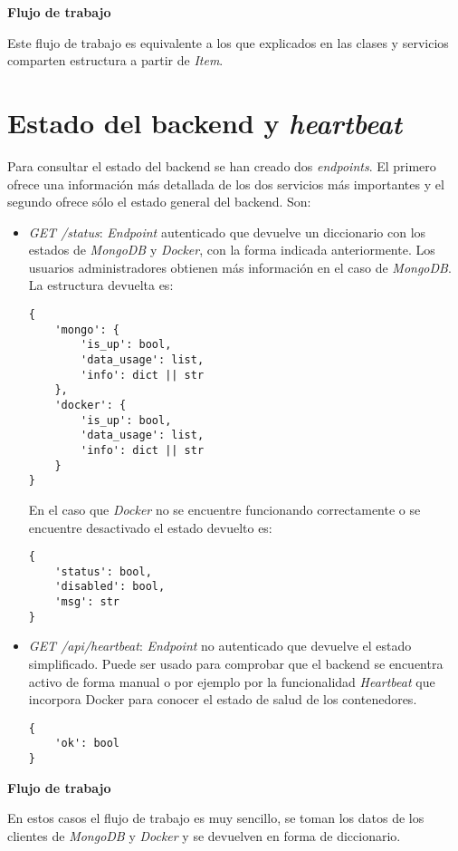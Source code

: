 \bigskip
\textbf{Flujo de trabajo}

Este flujo de trabajo es equivalente a los que explicados en las clases y servicios comparten estructura a partir de \textit{Item}.

\section{Estado del backend y \textit{heartbeat}}


Para consultar el estado del backend se han creado dos \textit{endpoints}. El primero ofrece una información más detallada de los dos servicios más importantes y el segundo ofrece sólo el estado general del backend. Son:
\begin{itemize}
	\item \textit{GET /status}: \textit{Endpoint} autenticado que devuelve un diccionario con los estados de \textit{MongoDB} y \textit{Docker}, con la forma indicada anteriormente. Los usuarios administradores obtienen más información en el caso de \textit{MongoDB}. La estructura devuelta es:

\begin{lstlisting}
{
	'mongo': {
		'is_up': bool,
		'data_usage': list,
		'info': dict || str
	},
	'docker': {
		'is_up': bool,
		'data_usage': list,
		'info': dict || str
	}
}
\end{lstlisting}

\bigskip	
En el caso que \textit{Docker} no se encuentre funcionando correctamente o se encuentre desactivado el estado devuelto es:
	
\begin{lstlisting}
{
	'status': bool,
	'disabled': bool,
	'msg': str
}
\end{lstlisting}
	
	\item \textit{GET /api/heartbeat}: \textit{Endpoint} no autenticado que devuelve el estado simplificado. Puede ser usado para comprobar que el backend se encuentra activo de forma manual o por ejemplo por la funcionalidad \textit{Heartbeat} que incorpora Docker para conocer el estado de salud de los contenedores.
	
\begin{lstlisting}
{
	'ok': bool
}
\end{lstlisting}
\end{itemize}

\bigskip
\textbf{Flujo de trabajo}

En estos casos el flujo de trabajo es muy sencillo, se toman los datos de los clientes de \textit{MongoDB} y \textit{Docker} y se devuelven en forma de diccionario.


